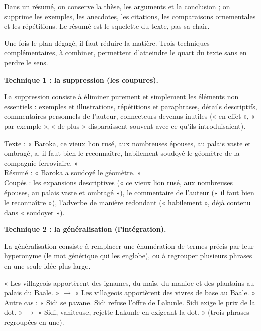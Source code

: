 \documentclass[11pt]{article}
\newcommand{\cle}[1]{{\popxbold\color{popdark}#1}}
\newcounter{popsec}
\newcounter{popsub}
\newcommand{\courssub}[1]{%
  \stepcounter{popsub}%
  \par\vspace{9pt}\noindent{\popxbold\fontsize{11.5}{13}\selectfont\color{popink}{\color{poporange}\thepopsec.\thepopsub}\hspace{6pt}#1}\par\nopagebreak\vspace{4pt}
}
\begin{document}
\begin{aretenir}
Dans un résumé, on conserve la \cle{thèse}, les \cle{arguments} et la \cle{conclusion} ; on supprime les \cle{exemples}, les anecdotes, les citations, les comparaisons ornementales et les répétitions. Le résumé est le squelette du texte, pas sa chair.
\end{aretenir}

\courssub{Les trois techniques de réduction}

Une fois le plan dégagé, il faut réduire la matière. Trois techniques complémentaires, à combiner, permettent d'atteindre le quart du texte sans en perdre le sens.

\textbf{Technique 1 : la suppression (les coupures).}

\begin{definition}[Suppression]
La \cle{suppression} consiste à éliminer purement et simplement les éléments non essentiels : exemples et illustrations, répétitions et paraphrases, détails descriptifs, commentaires personnels de l'auteur, connecteurs devenus inutiles (« en effet », « par exemple », « de plus » disparaissent souvent avec ce qu'ils introduisaient).
\end{definition}

\begin{exemplebox}
Texte : « Baroka, ce vieux lion rusé, aux nombreuses épouses, au palais vaste et ombragé, a, il faut bien le reconnaître, habilement soudoyé le géomètre de la compagnie ferroviaire. »\\
Résumé : « Baroka a soudoyé le géomètre. »\\
Coupés : les expansions descriptives (« ce vieux lion rusé, aux nombreuses épouses, au palais vaste et ombragé »), le commentaire de l'auteur (« il faut bien le reconnaître »), l'adverbe de manière redondant (« habilement », déjà contenu dans « soudoyer »).
\end{exemplebox}

\textbf{Technique 2 : la généralisation (l'intégration).}

\begin{definition}[Généralisation]
La \cle{généralisation} consiste à remplacer une énumération de termes précis par leur \cle{hyperonyme} (le mot générique qui les englobe), ou à regrouper plusieurs phrases en une seule idée plus large.
\end{definition}

\begin{exemplebox}
« Les villageois apportèrent des ignames, du maïs, du manioc et des plantains au palais du Baale. » $\rightarrow$ « Les villageois apportèrent des vivres de base au Baale. »\\
Autre cas : « Sidi se pavane. Sidi refuse l'offre de Lakunle. Sidi exige le prix de la dot. » $\rightarrow$ « Sidi, vaniteuse, rejette Lakunle en exigeant la dot. » (trois phrases regroupées en une).
\end{exemplebox}
\end{document}
